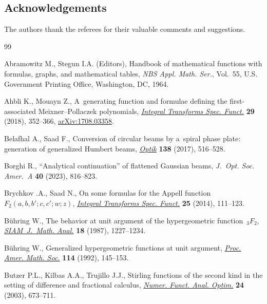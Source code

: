 \documentclass[pdftex]{sigma}
\numberwithin{equation}{section}
\begin{document}
\subsection*{Acknowledgements} The authors thank the referees for their valuable comments and suggestions.

\begin{thebibliography}{99}
\footnotesize\itemsep=0pt

Abramowitz M., Stegun I.A. (Editors), Handbook of mathematical functions with
 formulas, graphs, and mathematical tables, \textit{NBS Appl. Math. Ser.},
 Vol.~55, U.S. Government Printing Office, Washington, DC, 1964.

Ahbli K., Mouayn Z., A~generating function and formulae defining the
 first-associated {M}eixner--{P}ollaczek polynomials, \href{https://doi.org/10.1080/10652469.2018.1435647}{\textit{Integral
 Transforms Spec. Funct.}} \textbf{29} (2018), 352--366, \href{https://arxiv.org/abs/1708.03358}{arXiv:1708.03358}.

Belafhal A., Saad F., Conversion of circular beams by a~spiral phase plate:
 generation of generalized {H}umbert beams, \href{https://doi.org/10.1016/j.ijleo.2017.03.097}{\textit{Optik}} \textbf{138}
 (2017), 516--528.

Borghi R., ``Analytical continuation'' of flattened {G}aussian beams,
 \textit{J.~Opt. Soc. Amer.~A} \textbf{40} (2023), 816--823.

Brychkov {}.A., Saad N., On some formulas for the {A}ppell function
 {$F_2(a,b,b';c,c';w;z)$}, \href{https://doi.org/10.1080/10652469.2013.822207}{\textit{Integral Transforms Spec. Funct.}}
 \textbf{25} (2014), 111--123.

B\"uhring W., The behavior at unit argument of the hypergeometric
 function~{$_3F_2$}, \href{https://doi.org/10.1137/0518089}{\textit{SIAM~J.~Math. Anal.}} \textbf{18} (1987),
 1227--1234.

B\"uhring W., Generalized hypergeometric functions at unit argument,
 \href{https://doi.org/10.2307/2159793}{\textit{Proc. Amer. Math. Soc.}} \textbf{114} (1992), 145--153.

Butzer P.L., Kilbas A.A., Trujillo J.J., Stirling functions of the second kind
 in the setting of difference and fractional calculus, \href{https://doi.org/10.1081/NFA-120026366}{\textit{Numer. Funct.
 Anal. Optim.}} \textbf{24} (2003), 673--711.


\end{thebibliography}
\end{document}
